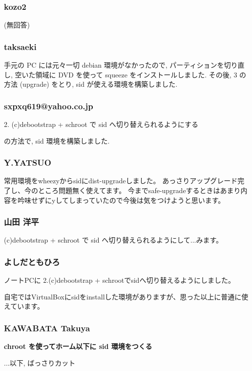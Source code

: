 \documentclass[cjk,dvipdfmx,12pt,%
hyperref={bookmarks=true,bookmarksnumbered=true,bookmarksopen=false,%
colorlinks=false,%
pdftitle={第 50 回 関西 Debian 勉強会},%
pdfauthor={倉敷・のがた・佐々木},%
pdfsubject={資料},%
}]{beamer}
\begin{document}
\begin{frame}[fragile]
\frametitle{ kozo2 }

(無回答)

\end{frame}

\begin{frame}[fragile]
\frametitle{ taksaeki }

手元の PC には元々一切 debian 環境がなかったので, パーティションを切り直し, 空いた領域に DVD を使って squeeze をインストールしました.
その後, 3 の方法 (upgrade) をとり, sid が使える環境を構築しました.

\end{frame}

\begin{frame}[fragile]
\frametitle{ sxpxq619@yahoo.co.jp }

2. (c)debootstrap + schroot で sid へ切り替えられるようにする

の方法で, sid 環境を構築しました.

\end{frame}

\begin{frame}[fragile]
\frametitle{ Y.YATSUO }

常用環境をwheezyからsidにdist-upgradeしました。
あっさりアップグレード完了し、今のところ問題無く使えてます。
今までsafe-upgradeするときはあまり内容を吟味せずにyしてしまっていたので今後は気をつけようと思います。

\end{frame}

\begin{frame}[fragile]
\frametitle{ 山田 洋平 }

(c)debootstrap + schroot で sid へ切り替えられるようにして...みます。

\end{frame}

\begin{frame}[fragile]
\frametitle{ よしだともひろ }

ノートPCに 2.(c)debootstrap + schrootでsidへ切り替えるようにしました。

自宅ではVirtualBoxにsidをinstallした環境がありますが、思った以上に普通に使えています。
\end{frame}

\begin{frame}[fragile]
\frametitle{ KAWABATA Takuya }
{\bf{chroot を使ってホーム以下に sid 環境をつくる}}

...以下, ばっさりカット
\end{frame}
\end{document}
